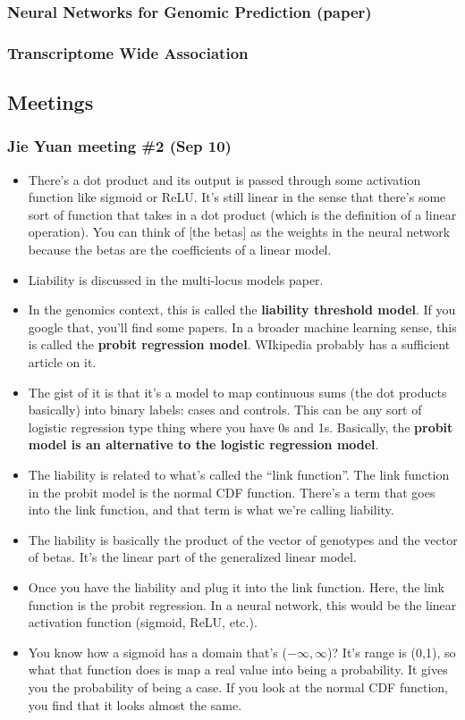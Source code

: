 \subsubsection*{Neural Networks for Genomic Prediction (paper) \cite{pinto2019can}}


\subsubsection*{Transcriptome Wide Association}

\subsection{Meetings}

\subsubsection*{Jie Yuan meeting \#2 (Sep 10)}
\begin{itemize}
\item
	There's a dot product and its output is passed through some activation function like sigmoid or ReLU. It's still linear in the sense that there's some sort of function that takes in a dot product (which is the definition of a linear operation).  You can think of [the betas] as the weights in the neural network because the betas are the coefficients of a linear model.

\item
	Liability is discussed in the multi-locus models paper.
\item
	In the genomics context, this is called the \textbf{liability threshold model}. If you google that, you'll find some papers. In a broader machine learning sense, this is called the \textbf{probit regression model}. WIkipedia probably has a sufficient article on it.
\item
	The gist of it is that it's a model to map continuous sums (the dot products basically) into binary labels: cases and controls. This can be any sort of logistic regression type thing where you have 0s and 1s. Basically, the \textbf{probit model is an alternative to the logistic regression model}.
\item
	The liability is related to what's called the ``link function''. The link function in the probit model is the normal CDF function. There's a term that goes into the link function, and that term is what we're calling liability.
\item
	The liability is basically the product of the vector of genotypes and the vector of betas. It's the linear part of the generalized linear model.
\item
	Once you have the liability and plug it into the link function. Here, the link function is the probit regression. In a neural network, this would be the linear activation function (sigmoid, ReLU, etc.).
\item
	You know how a sigmoid has a domain that's ($-\infty, \infty$)? It's range is (0,1), so what that function does is map a real value into being a probability. It gives you the probability of being a case. If you look at the normal CDF function, you find that it looks almost the same.
\end{itemize}

